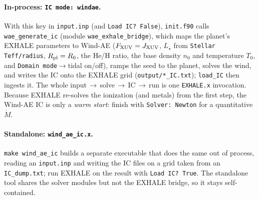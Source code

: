 \documentclass[english,a4paper]{my_memo}
\newcommand{\Mdot}{\ensuremath{\dot M}}
\newcommand{\code}[1]{\texttt{#1}}
\begin{document}
\paragraph{In-process: \code{IC mode: windae}.} With this key in
\code{input.inp} (and \code{Load IC?\ False}), \code{init.f90} calls
\code{wae\_generate\_ic} (module \code{wae\_exhale\_bridge}), which maps
the planet's EXHALE parameters to Wind-AE
($F_{\rm XUV}=J_{\rm XUV}$, $L_\star$ from \code{Stellar Teff/radius},
$R_{\rm pl}=R_0$, the He/H ratio, the base density $n_0$ and temperature
$T_0$, and \code{Domain mode}$\to$tidal on/off), ramps the seed to the
planet, solves the wind, and writes the IC onto the EXHALE grid
(\code{output/*\_IC.txt}); \code{load\_IC} then ingests it. The whole
input\,$\to$\,solve\,$\to$\,IC\,$\to$\,run is one \code{EXHALE.x}
invocation. Because EXHALE re-solves the ionization (and metals) from the
first step, the Wind-AE IC is only a \emph{warm start}: finish with
\code{Solver: Newton} for a quantitative \Mdot.
\paragraph{Standalone: \code{wind\_ae\_ic.x}.} \code{make wind\_ae\_ic}
builds a separate executable that does the same out of process, reading an
\code{input.inp} and writing the IC files on a grid taken from an
\code{IC\_dump.txt}; run EXHALE on the result with \code{Load IC?\ True}.
The standalone tool shares the solver modules but not the EXHALE bridge,
so it stays self-contained.

\end{document}
